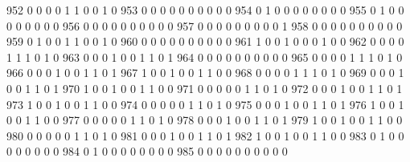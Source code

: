 \documentclass[compress,8pt]{beamer}
\begin{document}
\begin{frame}
\begin{Schunk}
  952      0       0   0              0        1    1       0       0   1   0
  953      0       0   0              0        0    0       0       0   0   0
  954      0       1   0              0        0    0       0       0   0   0
  955      0       1   0              0        0    0       0       0   0   0
  956      0       0   0              0        0    0       0       0   0   0
  957      0       0   0              0        0    0       0       0   0   1
  958      0       0   0              0        0    0       0       0   0   0
  959      0       1   0              0        1    1       0       0   1   0
  960      0       0   0              0        0    0       0       0   0   0
  961      1       0   0              1        0    0       0       1   0   0
  962      0       0   0              0        1    1       1       0   1   0
  963      0       0   0              1        0    0       1       1   0   1
  964      0       0   0              0        0    0       0       0   0   0
  965      0       0   0              0        1    1       1       0   1   0
  966      0       0   0              1        0    0       1       1   0   1
  967      1       0   0              1        0    0       1       1   0   0
  968      0       0   0              0        1    1       1       0   1   0
  969      0       0   0              1        0    0       1       1   0   1
  970      1       0   0              1        0    0       1       1   0   0
  971      0       0   0              0        0    1       1       0   1   0
  972      0       0   0              1        0    0       1       1   0   1
  973      1       0   0              1        0    0       1       1   0   0
  974      0       0   0              0        0    1       1       0   1   0
  975      0       0   0              1        0    0       1       1   0   1
  976      1       0   0              1        0    0       1       1   0   0
  977      0       0   0              0        0    1       1       0   1   0
  978      0       0   0              1        0    0       1       1   0   1
  979      1       0   0              1        0    0       1       1   0   0
  980      0       0   0              0        0    1       1       0   1   0
  981      0       0   0              1        0    0       1       1   0   1
  982      1       0   0              1        0    0       1       1   0   0
  983      0       1   0              0        0    0       0       0   0   0
  984      0       1   0              0        0    0       0       0   0   0
  985      0       0   0              0        0    0       0       0   0   0

\end{Schunk}
\end{frame}
\end{document}
